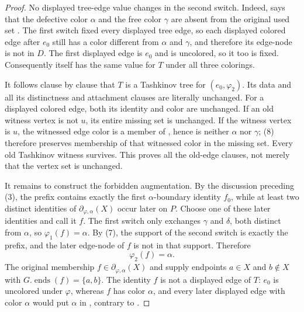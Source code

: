 \begin{proof}
No displayed tree-edge value changes in the second switch.  Indeed,
 says that the defective color
$\alpha$ and the free color $\gamma$ are absent from the original used
set .  The first switch fixed every displayed
tree edge, so each displayed colored edge after $e_0$ still has a color
different from $\alpha$ and $\gamma$, and therefore its edge-node is not
in $D$.  The first displayed edge is $e_0$ and is uncolored, so it too is
fixed.  Consequently  itself has the same value
for $T$ under all three colorings.

It follows clause by clause that $T$ is a Tashkinov tree for
$(e_0,\varphi_2)$.  Its  data and all its
distinctness and attachment clauses are literally unchanged.  For a
displayed colored edge, both its identity and color are unchanged.  If an
old  witness vertex is not $u$, its entire missing
set is unchanged.  If the witness vertex is $u$, the witnessed edge color
is a member of , hence is neither $\alpha$ nor
$\gamma$; (8) therefore preserves membership of that witnessed color in
the missing set.  Every old Tashkinov witness survives.  This proves all
the old-edge clauses, not merely that the vertex set is unchanged.

It remains to construct the forbidden augmentation.  By the discussion
preceding (3), the prefix contains exactly the first
$\alpha$-boundary identity $f_0$, while at least two distinct identities
of $\partial_{\varphi,\alpha}(X)$ occur later on $P$.  Choose one of
these later identities and call it $f$.  The first switch only exchanges
$\gamma$ and $\delta$, both distinct from $\alpha$, so
$\varphi_1(f)=\alpha$.  By (7), the support of the second switch is
exactly the prefix, and the later edge-node of $f$ is not in that support.
Therefore
\[
 \varphi_2(f)=\alpha. \tag{9}
\]
The original membership
$f\in\partial_{\varphi,\alpha}(X)$ and
 supply endpoints $a\in X$ and $b\notin X$ with
$G.\operatorname{ends}(f)=\{a,b\}$.  The identity $f$ is not a displayed
edge of $T$: $e_0$ is uncolored under $\varphi$, whereas $f$ has color
$\alpha$, and every later displayed edge with color $\alpha$ would put
$\alpha$ in , contrary to
.


\end{proof}
